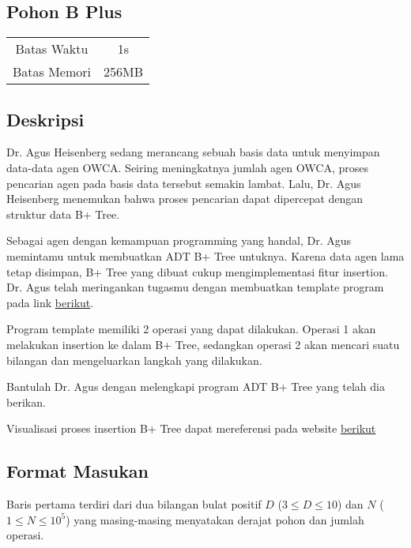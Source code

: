 \documentclass{article}
\begin{document}
\begin{center}

    
    \section*{Pohon B Plus} %

    \begin{tabular}{ | c c | }
        \hline
        Batas Waktu  & 1s \\    %
        Batas Memori & 256MB \\  %
        \hline
    \end{tabular}
\end{center}

\subsection*{Deskripsi}

Dr. Agus Heisenberg sedang merancang sebuah basis data untuk menyimpan data-data agen OWCA. Seiring meningkatnya jumlah agen OWCA, proses pencarian agen pada basis data tersebut semakin lambat. Lalu, Dr. Agus Heisenberg menemukan bahwa proses pencarian dapat dipercepat dengan struktur data B+ Tree. 

Sebagai agen dengan kemampuan programming yang handal, Dr. Agus memintamu untuk membuatkan ADT B+ Tree untuknya. Karena data agen lama tetap disimpan, B+ Tree yang dibuat cukup mengimplementasi fitur insertion. Dr. Agus telah meringankan tugasmu dengan membuatkan template program pada link \href{https://drive.google.com/drive/folders/19CcSmHoxypupEgl6w9DckooEcUfqM3qY?usp=sharing}{berikut}.

Program template memiliki 2 operasi yang dapat dilakukan. Operasi 1 akan melakukan insertion ke dalam B+ Tree, sedangkan operasi 2 akan mencari suatu bilangan dan mengeluarkan langkah yang dilakukan.

Bantulah Dr. Agus dengan melengkapi program ADT B+ Tree yang telah dia berikan.

Visualisasi proses insertion B+ Tree dapat mereferensi pada website \href{https://www.cs.usfca.edu/~galles/visualization/BTree.html}{berikut}

\subsection*{Format Masukan}

Baris pertama terdiri dari dua bilangan bulat positif $D$ ($3 \leq D \leq 10$) dan $N$ ($1 \leq N \leq 10^{5}$) yang masing-masing menyatakan derajat pohon dan jumlah operasi.
\end{document}
